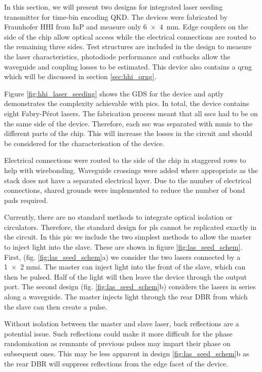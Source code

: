 In this section, we will present two designs for integrated laser seeding transmitter for time-bin encoding \ac{QKD}. The devices were fabricated by Fraunhofer HHI from \ac{InP} and measure only \SI{6x4}{mm}. Edge couplers on the side of the chip allow optical access while the electrical connections are routed to the remaining three sides. Test structures are included in the design to measure the laser characteristics, photodiode performance and cutbacks allow the waveguide and coupling losses to be estimated. This device also contains a \ac{qrng} which will be discussed in section \ref{sec:hhi_qrng}.

Figure \ref{fig:hhi_laser_seeding} shows the GDS for the device and aptly demonstrates the complexity achievable with \acp{pic}. In total, the device contains eight Fabry-P\'{e}rot lasers. The fabrication process meant that all \acp{ssc} had to be on the same side of the device. Therefore, each \ac{ssc} was separated with \acp{mmi} to the different parts of the chip. This will increase the losses in the circuit and should be considered for the characterisation of the device. 

Electrical connections were routed to the side of the chip in staggered rows to help with wirebonding. Waveguide crossings were added where appropriate as the stack does not have a separated electrical layer. Due to the number of electrical connections, shared grounds were implemented to reduce the number of bond pads required.


Currently, there are no standard methods to integrate optical isolation or circulators. Therefore, the standard design for \ac{pls} cannot be replicated exactly in the circuit. In this \ac{pic} we include the two simplest methods to allow the master to inject light into the slave. These are shown in figure \ref{fig:las_seed_schem}. First, (fig. \ref{fig:las_seed_schem}a) we consider the two lasers connected by a \num{1x2} \ac{mmi}. The master can inject light into the front of the slave, which can then be pulsed. Half of the light will then leave the device through the output port. The second design (fig. \ref{fig:las_seed_schem}b) considers the lasers in series along a waveguide. The master injects light through the rear \ac{DBR} from which the slave can then create a pulse. 

Without isolation between the master and slave laser, back reflections are a potential issue. Such reflections could make it more difficult for the phase randomisation as remnants of previous pulses may impart their phase on subsequent ones. This may be less apparent in design \ref{fig:las_seed_schem}b as the rear \ac{DBR} will suppress reflections from the edge facet of the device. 

